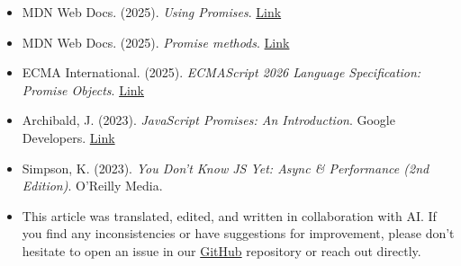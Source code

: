 \begin{itemize}
    \item MDN Web Docs. (2025). \textit{Using Promises}. \href{https://developer.mozilla.org/en-US/docs/Web/JavaScript/Guide/Using_promises}{Link}
    
    \item MDN Web Docs. (2025). \textit{Promise methods}. \href{https://developer.mozilla.org/en-US/docs/Web/JavaScript/Reference/Global_Objects/Promise#Static_methods}{Link}
    
    \item ECMA International. (2025). \textit{ECMAScript 2026 Language Specification: Promise Objects}. \href{https://tc39.es/ecma262/multipage/control-abstraction-objects.html#sec-promise-objects}{Link}
    
    \item Archibald, J. (2023). \textit{JavaScript Promises: An Introduction}. Google Developers. \href{https://web.dev/articles/promises}{Link}
    
    \item Simpson, K. (2023). \textit{You Don't Know JS Yet: Async \& Performance (2nd Edition)}. O'Reilly Media.

    \item This article was translated, edited, and written in collaboration with AI. If you find any inconsistencies or have suggestions for improvement, please don't hesitate to open an issue in our \href{https://github.com/asanchezyali/social-media-posts}{GitHub} repository or reach out directly.
\end{itemize}

